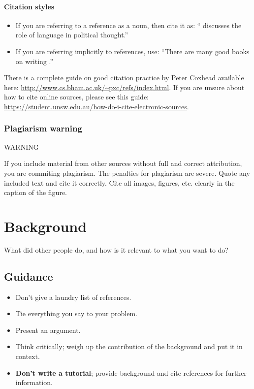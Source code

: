 \documentclass{l4proj}
\begin{document}
\subsubsection{Citation styles}

\begin{itemize}
    \item If you are referring to a reference as a noun, then cite it as: ``\citet{Orw68} discusses the role of language in political thought.''
    \item If you are referring implicitly to references, use: ``There are many good books on writing \citep{Orw68, Wil09, Pin15}.''
\end{itemize}

There is a complete guide on good citation practice by Peter Coxhead available here: \url{http://www.cs.bham.ac.uk/~pxc/refs/index.html}. 
If you are unsure about how to cite online sources, please see this guide: \url{https://student.unsw.edu.au/how-do-i-cite-electronic-sources}.

\subsection{Plagiarism warning}

\begin{highlight_title}{WARNING}
    
    If you include material from other sources without full and correct attribution, you are commiting plagiarism. The penalties for plagiarism are severe.
    Quote any included text and cite it correctly. Cite all images, figures, etc. clearly in the caption of the figure.
\end{highlight_title}


\chapter{Background}
What did other people do, and how is it relevant to what you want to do?
\section{Guidance}
\begin{itemize}    
    \item
          Don't give a laundry list of references.
    \item
          Tie everything you say to your problem.
    \item
          Present an argument.
    \item Think critically; weigh up the contribution of the background and put it in context.
    \item
          \textbf{Don't write a tutorial}; provide background and cite
          references for further information.
\end{itemize}
\end{document}
